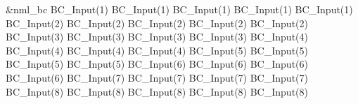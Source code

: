 \noindent\begin{minipage}{\textwidth}
\begin{nmldescitem}[%
   fontupper=\ttfamily\footnotesize%
  ,listing options={escapeinside={!@}{!@}}%
]
&nml_bc
  BC_Input(1)%
  BC_Input(1)%
  BC_Input(1)%
  BC_Input(1)%
  BC_Input(1)%
  BC_Input(2)%
  BC_Input(2)%
  BC_Input(2)%
  BC_Input(2)%
  BC_Input(2)%
  BC_Input(3)%
  BC_Input(3)%
  BC_Input(3)%
  BC_Input(3)%
  BC_Input(4)%
  BC_Input(4)%
  BC_Input(4)%
  BC_Input(4)%
  BC_Input(5)%
  BC_Input(5)%
  BC_Input(5)%
  BC_Input(5)%
  BC_Input(6)%
  BC_Input(6)%
  BC_Input(6)%
  BC_Input(6)%
  BC_Input(7)%
  BC_Input(7)%
  BC_Input(7)%
  BC_Input(7)%
  BC_Input(8)%
  BC_Input(8)%
  BC_Input(8)%
  BC_Input(8)%
  BC_Input(8)%

\end{nmldescitem}
\end{minipage}
